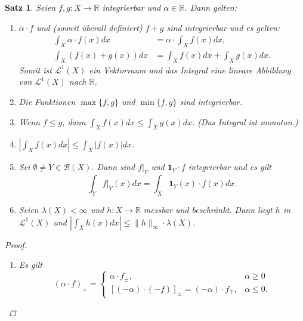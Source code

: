 \documentclass[a4paper]{scrreprt}
\newcommand{\doubleOne}{\textbf{1}}
\newcommand{\R}{\mathbb{R}}
\newcommand{\Borel}{\mathcal{B}}
\newcommand{\Leb}{\mathcal{L}}
\newcommand{\jlabel}[1]{\label{j_#1}}
\newcommand{\jabb}[3]{ #1: #2 \rightarrow #3 }
\theoremstyle{plain}
\newtheorem{satz}[thm]{Satz}
\theoremstyle{definition}
\begin{document}
{{{{\begin{satz}
\jlabel{Satz 2.25}
    Seien $\jabb{f,g}{X}{\R}$ integrierbar und $\alpha \in \R$. Dann gelten:
    \begin{enumerate}
        \item 
            $\alpha\cdot f$ und (soweit überall definiert) $f+g$ sind integrierbar und es gelten:
            \begin{displaymath}
                \begin{split}
                    \int_X \alpha \cdot f(x) dx &= \alpha\cdot \int_X f(x) dx,\\
                    \int_X (f(x) + g(x)) dx &= \int_X f(x)dx + \int_X g(x) dx.
                \end{split}
            \end{displaymath}
            Somit ist $\Leb^1(X)$ ein Vektorraum und das Integral eine lineare Abbildung von $\Leb^1(X)$ nach $\R$.
        \item Die Funktionen $\max\{f,g\}$ und $\min\{f,g\}$ sind integrierbar.
        \item Wenn $f\le g$, dann $\int_X f(x)dx \le \int_X g(x) dx$. (Das Integral ist monoton.)
        \item $|\int_X f(x)dx| \le \int_X |f(x)| dx$.
        \item
            Sei $\emptyset \ne Y \in \Borel(X)$. Dann sind $f|_Y$ und $\doubleOne_Y\cdot f$ integrierbar und es gilt
            \begin{displaymath}
                \int_Y f|_Y(x) dx = \int_X \doubleOne_Y (x) \cdot f(x) dx.
            \end{displaymath}
        \item
            Seien $\lambda(X) < \infty$ und $\jabb{h}{X}{\R}$ messbar und beschränkt. Dann liegt $h$ in $\Leb^1(X)$ und $|\int_X h(x) dx| \le \lVert h \rVert_\infty \cdot \lambda(X)$.
    \end{enumerate}
    \begin{proof}
        \begin{enumerate}
            \item 
                Es gilt
                \begin{displaymath}
                    (\alpha\cdot f)_\pm = \begin{cases}
                                              \alpha \cdot f_\pm, &\alpha \ge 0\\
                                              [(-\alpha)\cdot (-f)]_\pm = (-\alpha)\cdot f_\mp, &\alpha \le 0.

\end{cases}
\end{displaymath}
\end{enumerate}
\end{proof}
\end{satz}}}}}
\end{document}
